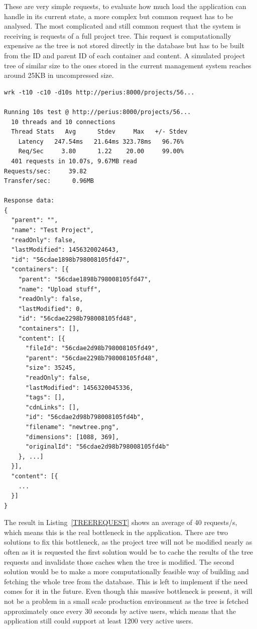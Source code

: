 \documentclass[a4paper,12pt]{article}
\begin{document}
\par These are very simple requests, to evaluate how much load the application can handle in its
current state, a more complex but common request has to be analysed. The most complicated and still
common request that the system is receiving is requests of a full project tree. This request is
computationally expensive as the tree is not stored directly in the database but has to be built
from the ID and parent ID of each container and content. A simulated project tree of similar size to
the ones stored in the current management system reaches around 25KB in uncompressed size.

\begin{minipage}{\linewidth-1cm}
\begin{lstlisting}[label=TREEREQUEST,caption=Result of project tree requests]
wrk -t10 -c10 -d10s http://perius:8000/projects/56...
 
Running 10s test @ http://perius:8000/projects/56...
  10 threads and 10 connections
  Thread Stats   Avg      Stdev     Max   +/- Stdev
    Latency   247.54ms   21.64ms 323.78ms   96.76%
    Req/Sec     3.80      1.22    20.00     99.00%
  401 requests in 10.07s, 9.67MB read
Requests/sec:     39.82
Transfer/sec:      0.96MB

Response data:
{
  "parent": "",
  "name": "Test Project",
  "readOnly": false,
  "lastModified": 1456320024643,
  "id": "56cdae1898b798008105fd47",
  "containers": [{
    "parent": "56cdae1898b798008105fd47",
    "name": "Upload stuff",
    "readOnly": false,
    "lastModified": 0,
    "id": "56cdae2298b798008105fd48",
    "containers": [],
    "content": [{
      "fileId": "56cdae2d98b798008105fd49",
      "parent": "56cdae2298b798008105fd48",
      "size": 35245,
      "readOnly": false,
      "lastModified": 1456320045336,
      "tags": [],
      "cdnLinks": [],
      "id": "56cdae2d98b798008105fd4b",
      "filename": "newtree.png",
      "dimensions": [1088, 369],
      "originalId": "56cdae2d98b798008105fd4b"
    }, ...]
  }],
  "content": [{
    ...
  }]
}
\end{lstlisting}
\end{minipage}

The result in Listing~\ref{TREEREQUEST} shows an average of 40 requests/s, which means this is the
real bottleneck in the application. There are two solutions to fix this bottleneck, as the project
tree will not be modified nearly as often as it is requested the first solution would be to cache the
results of the tree requests and invalidate those caches when the tree is modified. The second
solution would be to make a more computationally feasible way of building and fetching the whole 
tree from the database. This is left to implement if the need comes for it in the future. Even
though this massive bottleneck is present, it will not be a problem in a small scale production
environment as the tree is fetched approximately once every 30 seconds by active users, which means
that the application still could support at least 1200 very active users.
\end{document}
